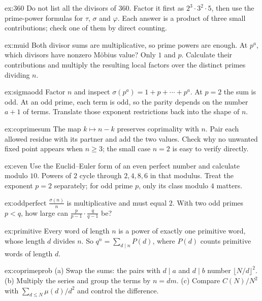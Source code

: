\begin{hint}{ex:360}
Do not list all the divisors of $360$. Factor it first as $2^3\cdot3^2\cdot5$, then use the prime-power formulas for $\tau$, $\sigma$ and $\varphi$. Each answer is a product of three small contributions; check one of them by direct counting.
\end{hint}
\begin{hint}{ex:muid}
Both divisor sums are multiplicative, so prime powers are enough. At $p^a$, which divisors have nonzero M\"obius value? Only $1$ and $p$. Calculate their contributions and multiply the resulting local factors over the distinct primes dividing $n$.
\end{hint}
\begin{hint}{ex:sigmaodd}
Factor $n$ and inspect $\sigma(p^a)=1+p+\cdots+p^a$. At $p=2$ the sum is odd. At an odd prime, each term is odd, so the parity depends on the number $a+1$ of terms. Translate those exponent restrictions back into the shape of $n$.
\end{hint}
\begin{hint}{ex:coprimesum}
The map $k\mapsto n-k$ preserves coprimality with $n$. Pair each allowed residue with its partner and add the two values. Check why no unwanted fixed point appears when $n\ge3$; the small case $n=2$ is easy to verify directly.
\end{hint}
\begin{hint}{ex:even}
Use the Euclid--Euler form of an even perfect number and calculate modulo $10$. Powers of $2$ cycle through $2,4,8,6$ in that modulus. Treat the exponent $p=2$ separately; for odd prime $p$, only its class modulo $4$ matters.
\end{hint}
\begin{hint}{ex:oddperfect}
$\frac{\sigma(n)}n$ is multiplicative and must equal $2$. With two odd primes $p<q$, how large can $\frac p{p-1}\cdot\frac q{q-1}$ be?
\end{hint}
\begin{hint}{ex:primitive}
Every word of length $n$ is a power of exactly one primitive word, whose length $d$ divides $n$. So $q^n=\sum_{d\mid n}P(d)$, where $P(d)$ counts primitive words of length $d$.
\end{hint}
\begin{hint}{ex:coprimeprob}
(a) Swap the sums: the pairs with $d\mid a$ and $d\mid b$ number $\lfloor N/d\rfloor^2$. (b) Multiply the series and group the terms by $n=dm$. (c) Compare $C(N)/N^2$ with $\sum_{d\le N}\mu(d)/d^2$ and control the difference.
\end{hint}


